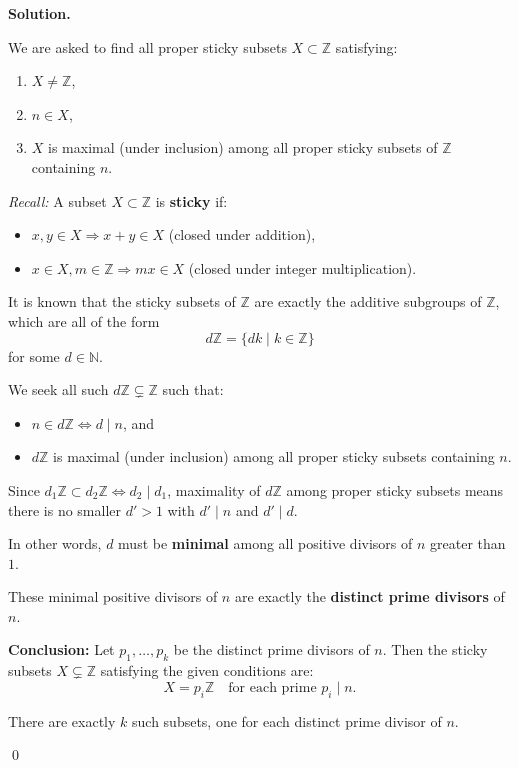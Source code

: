 \documentclass[12pt]{article}
\newenvironment{solution}{%
	\par\medskip
	\noindent\textbf{Solution.}\par\nopagebreak
}{%
	\hfill \qed \par\medskip
}
\begin{document}
\begin{solution}
We are asked to find all proper sticky subsets $X \subset \mathbb{Z}$ satisfying:
\begin{enumerate}[label=(\roman*)]
  \item $X \ne \mathbb{Z}$,
  \item $n \in X$,
  \item $X$ is maximal (under inclusion) among all proper sticky subsets of $\mathbb{Z}$ containing $n$.
\end{enumerate}

\textit{Recall:} A subset $X \subset \mathbb{Z}$ is \textbf{sticky} if:
\begin{itemize}
  \item $x, y \in X \Rightarrow x + y \in X$ (closed under addition),
  \item $x \in X, m \in \mathbb{Z} \Rightarrow mx \in X$ (closed under integer multiplication).
\end{itemize}

It is known that the sticky subsets of $\mathbb{Z}$ are exactly the additive subgroups of $\mathbb{Z}$, which are all of the form
\[
d\mathbb{Z} = \{dk \mid k \in \mathbb{Z}\}
\]
for some $d \in \mathbb{N}$.

We seek all such $d\mathbb{Z} \subsetneq \mathbb{Z}$ such that:
\begin{itemize}
  \item $n \in d\mathbb{Z} \iff d \mid n$, and
  \item $d\mathbb{Z}$ is maximal (under inclusion) among all proper sticky subsets containing $n$.
\end{itemize}

Since $d_1\mathbb{Z} \subset d_2\mathbb{Z} \iff d_2 \mid d_1$, maximality of $d\mathbb{Z}$ among proper sticky subsets means there is no smaller $d' > 1$ with $d' \mid n$ and $d' \mid d$.

In other words, $d$ must be \textbf{minimal} among all positive divisors of $n$ greater than $1$.

These minimal positive divisors of $n$ are exactly the \textbf{distinct prime divisors} of $n$.

\medskip

\textbf{Conclusion:} Let $p_1, \dots, p_k$ be the distinct prime divisors of $n$. Then the sticky subsets $X \subsetneq \mathbb{Z}$ satisfying the given conditions are:
\[
X = p_i\mathbb{Z} \quad \text{for each prime } p_i \mid n.
\]

There are exactly $k$ such subsets, one for each distinct prime divisor of $n$.
	
\end{solution}
\end{document}
